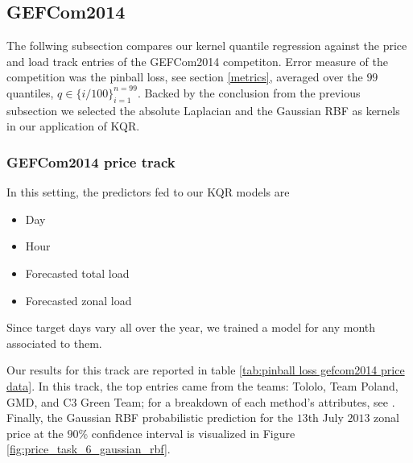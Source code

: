 \subsection{GEFCom2014}
The follwing subsection compares our kernel quantile regression against the price and load track entries of the GEFCom2014 competiton.
Error measure of the competition was the pinball loss, see section \ref{metrics}, averaged over the $99$ quantiles, $q \in \{i/100\}_{i=1}^{n=99}$. Backed by the conclusion from the previous subsection we selected the absolute Laplacian and the Gaussian RBF as kernels in our application of KQR.


\subsubsection{GEFCom2014 price track}
In this setting, the predictors fed to our KQR models are
\begin{itemize}
    \item Day
    \item Hour
    \item Forecasted total load
    \item Forecasted zonal load
\end{itemize}
Since target days vary all over the year, we trained a model for any month associated to them.

Our results for this track are reported in table \ref{tab:pinball loss gefcom2014 price data}. In this track, the top entries came from the teams: Tololo, Team Poland, GMD, and C3 Green Team; for a breakdown of each method's attributes, see \cite[Table 8]{hong2016probabilistic}. Finally, the Gaussian RBF probabilistic prediction for the $13$th July $2013$ zonal price at the $90\%$ confidence interval is visualized in Figure \ref{fig:price_task_6_gaussian_rbf}.


